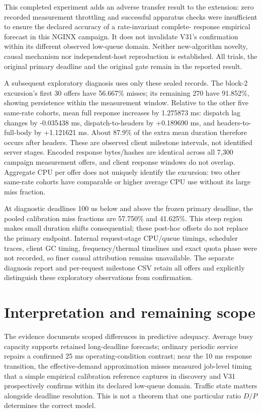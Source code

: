 \documentclass[11pt,a4paper]{article}
\begin{document}
This completed experiment adds an adverse transfer result to the extension:
zero recorded measurement throttling and successful apparatus checks were
insufficient to ensure the declared accuracy of a rate-invariant complete-
response empirical forecast in this NGINX campaign. It does not invalidate
V31's confirmation within its different observed low-queue domain. Neither
new-algorithm novelty, causal mechanism nor independent-host reproduction is
established. All trials, the original primary deadline and the original gate
remain in the reported result.

A subsequent exploratory diagnosis uses only these sealed records. The
block-2 excursion's first 30 offers have 56.667\% misses; its remaining 270
have 91.852\%, showing persistence within the measurement window. Relative
to the other five same-rate cohorts, mean full response increases by 1.275873
ms: dispatch lag changes by -0.035438 ms, dispatch-to-headers by +0.189690 ms,
and headers-to-full-body by +1.121621 ms. About 87.9\% of the extra mean duration
therefore occurs after headers. These are observed client milestone intervals,
not identified server stages. Encoded response bytes/hashes are identical
across all 7,300 campaign measurement offers, and client response windows do
not overlap. Aggregate CPU per offer does not uniquely identify the excursion:
two other same-rate cohorts have comparable or higher average CPU use without
its large miss fraction.

At diagnostic deadlines 100 us below and above the frozen primary deadline,
the pooled calibration miss fractions are 57.750\% and 41.625\%. This steep
region makes small duration shifts consequential; these post-hoc offsets do
not replace the primary endpoint. Internal request-stage CPU/queue timings,
scheduler traces, client GC timing, frequency/thermal timelines and exact
quota phase were not recorded, so finer causal attribution remains unavailable.
The separate diagnosis report and per-request milestone CSV retain all offers
and explicitly distinguish these exploratory observations from confirmation.

\section{Interpretation and remaining scope}

The evidence documents scoped differences in predictive adequacy. Average busy
capacity supports retained long-deadline forecasts; ordinary periodic service
repairs a confirmed 25 ms operating-condition contrast; near the 10 ms response
transition, the effective-demand approximation misses measured job-level
timing that a simple empirical calibration reference captures in discovery
and V31 prospectively confirms within its declared low-queue domain.
Traffic state matters alongside deadline resolution. This is not a theorem
that one particular ratio $D/P$ determines the correct model.
\end{document}
